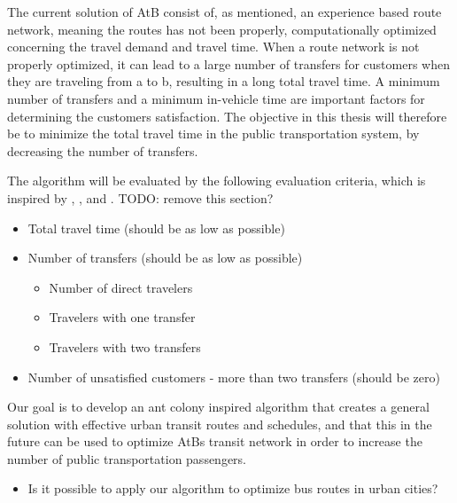 The current solution of AtB \citep{website:atb} consist of, as mentioned, an experience based route network, meaning the routes has not been properly, computationally optimized concerning the travel demand and travel time. When a route network is not properly optimized, it can lead to a large number of transfers for customers when they are traveling from a to b, resulting in a long total travel time. A minimum number of transfers and a minimum in-vehicle time are important factors for determining the customers satisfaction. The objective in this thesis will therefore be to minimize the total travel time in the public transportation system, by decreasing the number of transfers. %

The algorithm will be evaluated by the following evaluation criteria, which is inspired by \citep{kechagiopoulos14}, \citep{mandl80}, \citep{nikolic14} and \citep{fan09}. TODO: remove this section?
\begin{itemize}
\item Total travel time (should be as low as possible)
\item Number of transfers (should be as low as possible)
\begin{itemize}
\item Number of direct travelers
\item Travelers with one transfer
\item Travelers with two transfers
\end{itemize}
\item Number of unsatisfied customers - more than two transfers (should be zero)
\end{itemize}

Our goal is to develop an ant colony inspired algorithm that creates a general solution with effective urban transit routes and schedules, and that this in the future can be used to optimize AtBs transit network in order to increase the number of public transportation passengers. 
\begin{itemize}
\item Is it possible to apply our algorithm to optimize bus routes in urban cities?
\end{itemize}
